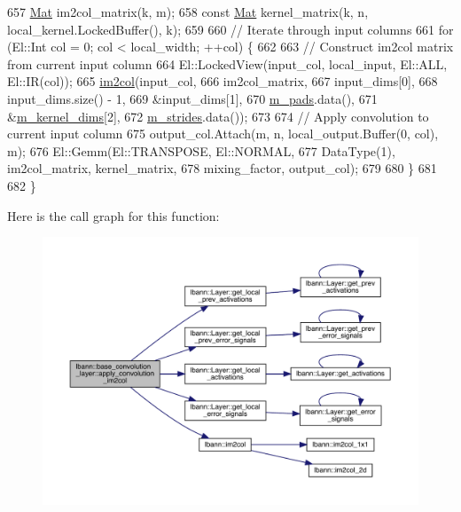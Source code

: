 \begin{DoxyCode}
657     \hyperlink{base_8hpp_a68f11fdc31b62516cb310831bbe54d73}{Mat} im2col\_matrix(k, m);
658     \textcolor{keyword}{const} \hyperlink{base_8hpp_a68f11fdc31b62516cb310831bbe54d73}{Mat} kernel\_matrix(k, n, local\_kernel.LockedBuffer(), k);
659 
660     \textcolor{comment}{// Iterate through input columns}
661     \textcolor{keywordflow}{for} (El::Int col = 0; col < local\_width; ++col) \{
662 
663       \textcolor{comment}{// Construct im2col matrix from current input column}
664       El::LockedView(input\_col, local\_input, El::ALL, El::IR(col));
665       \hyperlink{namespacelbann_aa3636a1979e40da2af91f30a12b90db9}{im2col}(input\_col,
666              im2col\_matrix,
667              input\_dims[0],
668              input\_dims.size() - 1,
669              &input\_dims[1],
670              \hyperlink{classlbann_1_1base__convolution__layer_a9732a8a0170a413bf0cde0128ad2a571}{m\_pads}.data(),
671              &\hyperlink{classlbann_1_1base__convolution__layer_a283edb6a476f975e713d0b4235ac658f}{m\_kernel\_dims}[2],
672              \hyperlink{classlbann_1_1base__convolution__layer_a2429495822363e41f1f6b96a6b430445}{m\_strides}.data());
673 
674       \textcolor{comment}{// Apply convolution to current input column}
675       output\_col.Attach(m, n, local\_output.Buffer(0, col), m);
676       El::Gemm(El::TRANSPOSE, El::NORMAL,
677                DataType(1), im2col\_matrix, kernel\_matrix,
678                mixing\_factor, output\_col);
679 
680     \}
681 
682   \}
\end{DoxyCode}
Here is the call graph for this function\+:\nopagebreak
\begin{figure}[H]
\begin{center}
\leavevmode
\includegraphics[width=350pt]{classlbann_1_1base__convolution__layer_a0710d46aa54d92f94de920ed37f6ef11_cgraph}
\end{center}
\end{figure}

